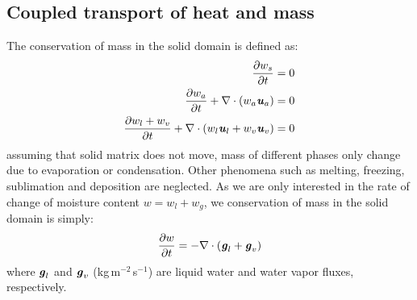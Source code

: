 \subsection{Coupled transport of heat and mass}

The conservation of mass in the solid domain is defined as:
\begin{align}
\frac{\partial w_s}{\partial t} &= 0 \\
\frac{\partial w_a}{\partial t} + \nabla \cdot \left(w_a\textbf{\textit{u}}_a \right) &= 0 \\
\frac{\partial w_l + w_v}{\partial t} + \nabla \cdot \left(w_l\textbf{\textit{u}}_l + w_v\textbf{\textit{u}}_v \right) &= 0
\end{align}
assuming that solid matrix does not move, mass of different phases only change due to evaporation or condensation. Other phenomena such as melting, freezing, sublimation and deposition are neglected. As we are only interested in the rate of change of moisture content $w = w_l + w_g$, we conservation of mass in the solid domain is simply:
\begin{equation}
 \frac{\partial w}{\partial t} = - \nabla \cdot \left(\textbf{\textit{g}}_l + \textbf{\textit{g}}_v \right)
\end{equation}
where $\textbf{\textit{g}}_l$ and $\textbf{\textit{g}}_v$ (kg\,m$^{-2}$\,s$^{-1}$) are liquid water and water vapor fluxes, respectively.

